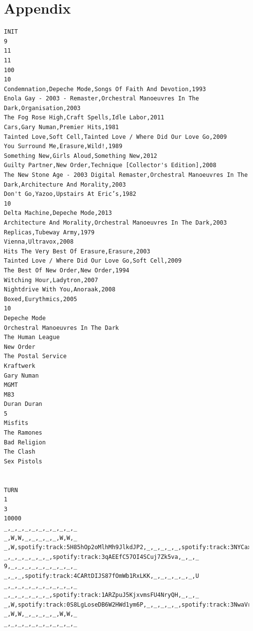 \documentclass[a4paper, 10pt]{article}
\begin{document}
\section*{Appendix}
\begin{verbatim}
INIT 
9
11
11
100
10
Condemnation,Depeche Mode,Songs Of Faith And Devotion,1993
Enola Gay - 2003 - Remaster,Orchestral Manoeuvres In The Dark,Organisation,2003
The Fog Rose High,Craft Spells,Idle Labor,2011
Cars,Gary Numan,Premier Hits,1981
Tainted Love,Soft Cell,Tainted Love / Where Did Our Love Go,2009
You Surround Me,Erasure,Wild!,1989
Something New,Girls Aloud,Something New,2012
Guilty Partner,New Order,Technique [Collector's Edition],2008
The New Stone Age - 2003 Digital Remaster,Orchestral Manoeuvres In The Dark,Architecture And Morality,2003
Don't Go,Yazoo,Upstairs At Eric’s,1982
10
Delta Machine,Depeche Mode,2013
Architecture And Morality,Orchestral Manoeuvres In The Dark,2003
Replicas,Tubeway Army,1979
Vienna,Ultravox,2008
Hits The Very Best Of Erasure,Erasure,2003
Tainted Love / Where Did Our Love Go,Soft Cell,2009
The Best Of New Order,New Order,1994
Witching Hour,Ladytron,2007
Nightdrive With You,Anoraak,2008
Boxed,Eurythmics,2005
10
Depeche Mode
Orchestral Manoeuvres In The Dark
The Human League
New Order
The Postal Service
Kraftwerk
Gary Numan
MGMT
M83
Duran Duran
5
Misfits
The Ramones
Bad Religion
The Clash
Sex Pistols


TURN
1
3
10000
_,_,_,_,_,_,_,_,_,_,_
_,W,W,_,_,_,_,_,W,W,_
_,W,spotify:track:5H85hOp2oMlhMh9JlkdJP2,_,_,_,_,_,spotify:track:3NYCaxkggl0Hh8vQptSUvV,W,_
_,_,_,_,_,_,_,spotify:track:3qAEEfC57OI4SCuj7Zk5va,_,_,_
9,_,_,_,_,_,_,_,_,_,_
_,_,_,spotify:track:4CARtDIJS87fOmWb1RxLKK,_,_,_,_,_,_,U
_,_,_,_,_,_,_,_,_,_,_
_,_,_,_,_,_,_,spotify:track:1ARZpuJ5KjxvmsFU4NryQH,_,_,_
_,W,spotify:track:0S8LgLoseDB6W2HWd1ym6P,_,_,_,_,_,spotify:track:3NwaVr6RJg2LPBcJ1Ysl1O,W,_
_,W,W,_,_,_,_,_,W,W,_
_,_,_,_,_,_,_,_,_,_,_

\end{verbatim}
\end{document}
